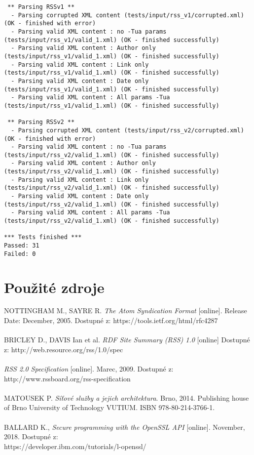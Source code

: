 \documentclass[11pt,a4paper]{article}
\begin{document}
{\begin{verbatim}
 ** Parsing RSSv1 ** 
  - Parsing corrupted XML content (tests/input/rss_v1/corrupted.xml) (OK - finished with error)
  - Parsing valid XML content : no -Tua params (tests/input/rss_v1/valid_1.xml) (OK - finished successfully) 
  - Parsing valid XML content : Author only (tests/input/rss_v1/valid_1.xml) (OK - finished successfully) 
  - Parsing valid XML content : Link only (tests/input/rss_v1/valid_1.xml) (OK - finished successfully) 
  - Parsing valid XML content : Date only (tests/input/rss_v1/valid_1.xml) (OK - finished successfully) 
  - Parsing valid XML content : All params -Tua (tests/input/rss_v1/valid_1.xml) (OK - finished successfully) 

 ** Parsing RSSv2 ** 
  - Parsing corrupted XML content (tests/input/rss_v2/corrupted.xml) (OK - finished with error)
  - Parsing valid XML content : no -Tua params (tests/input/rss_v2/valid_1.xml) (OK - finished successfully) 
  - Parsing valid XML content : Author only (tests/input/rss_v2/valid_1.xml) (OK - finished successfully) 
  - Parsing valid XML content : Link only (tests/input/rss_v2/valid_1.xml) (OK - finished successfully) 
  - Parsing valid XML content : Date only (tests/input/rss_v2/valid_1.xml) (OK - finished successfully) 
  - Parsing valid XML content : All params -Tua (tests/input/rss_v2/valid_1.xml) (OK - finished successfully) 

*** Tests finished ***
Passed: 31
Failed: 0
\end{verbatim}
}
\section{Použité zdroje}
NOTTINGHAM M., SAYRE R. \textit{The Atom Syndication Format} [online]. Release Date: December, 2005. Dostupné z: https://tools.ietf.org/html/rfc4287\\\\
BRICLEY D., DAVIS Ian et al. \textit{RDF Site Summary (RSS) 1.0} [online] Dostupné z: 
http://web.resource.org/rss/1.0/spec\\\\
\textit{RSS 2.0 Specification} [online]. Marec, 2009. Dostupné z: http://www.rssboard.org/rss-specification\\\\
MATOUSEK P. \textit{Síťové služby a jejich architektura}. Brno, 2014. Publishing house of Brno University of Technology VUTIUM. ISBN  978-80-214-3766-1.\\\\
BALLARD K., \textit{Secure programming with the OpenSSL API} [online]. November, 2018. Dostupné z:\\ https://developer.ibm.com/tutorials/l-openssl/
\end{document}
